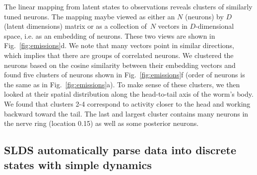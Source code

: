 \documentclass[11pt]{article}
\begin{document}
The linear mapping from latent states to observations reveals clusters
of similarly tuned neurons.  The mapping maybe viewed as either an $N$
(neurons) by $D$ (latent dimensions) matrix or as a collection of~$N$
vectors in $D$-dimensional space, i.e. as an embedding of neurons.
These two views are shown in Fig.~\ref{fig:emissions}d. We note that
many vectors point in similar directions, which implies that there are
groups of correlated neurons.  We clustered the neurons based on the
cosine similarity between their embedding vectors and found five clusters
of neurons shown in Fig.~\ref{fig:emissions}f (order of neurons is the same
as in Fig.~\ref{fig:emissions}a). To make sense of these clusters, we then
looked at their spatial distribution along the head-to-tail axis of the
worm's body.  We found that clusters 2-4 correspond to activity closer to
the head and working backward toward the tail.  The last and largest cluster
contains many neurons in the nerve ring (location 0.15)  as well
as some posterior neurons. 


\subsection*{SLDS automatically parse data into discrete states with simple dynamics}
\end{document}
